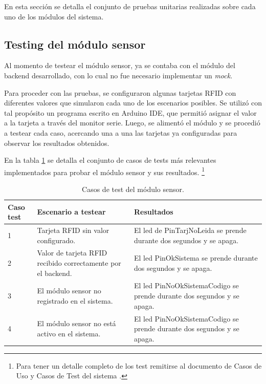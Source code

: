 En esta sección se detalla el conjunto de pruebas unitarias realizadas sobre cada uno de los módulos del sistema.

\subsection{Testing del módulo sensor}

Al momento de testear el módulo sensor, ya se contaba con el módulo del backend desarrollado, con lo cual no fue necesario implementar un \textit{mock}.

Para proceder con las pruebas, se configuraron algunas tarjetas RFID con diferentes valores que simularon cada uno de los escenarios posibles. Se utilizó con tal propósito un programa escrito en Arduino IDE, que permitió asignar el valor a la tarjeta a través del monitor serie. Luego, se alimentó el módulo y se procedió a testear cada caso, acercando una a una las tarjetas ya configuradas para observar los resultados obtenidos.

En la tabla \ref{tab:tablaTestNodSensor} se detalla el conjunto de casos de tests más relevantes implementados para probar el módulo sensor y sus resultados. \footnote{Para tener un detalle completo de los test remitirse al documento de Casos de Uso y Casos de Test del sistema \citep{WEBSITE:CasosUsoYTest}.}

\begin{table}[h]
	\centering
	\caption[Tipos de pruebas sensor]{Casos de test del módulo sensor.}
	\begin{tabular}{p{1.5cm} p{5.5cm} p{5.5cm}} 	

		\toprule
		\textbf{Caso test} & 
		\textbf{Escenario a testear} & 
		\textbf{Resultados} 
		\\
		\midrule
1 & Tarjeta RFID sin valor configurado. & El led de PinTarjNoLeida se prende durante dos segundos y se apaga. \\
2 & Valor de tarjeta RFID recibido correctamente por el backend.	& El led PinOkSistema se prende durante dos segundos y se apaga. \\
3 & El módulo sensor no registrado en el sistema. & El led PinNoOkSistemaCodigo se prende durante dos segundos y se apaga. \\
4 & El módulo sensor no está activo en el sistema. & El led PinNoOkSistemaCodigo se prende durante dos segundos y se apaga. \\	   
		\bottomrule
		\hline
	\end{tabular}
	\label{tab:tablaTestNodSensor}
\end{table}

